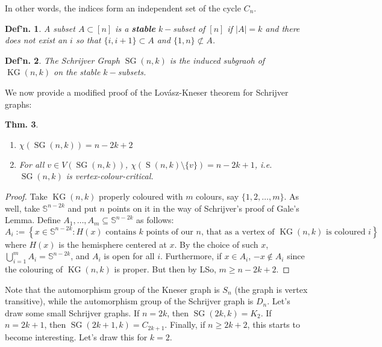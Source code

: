 \documentclass[12pt, a4paper]{book}
\DeclareMathOperator{\KG}{KG}
\DeclareMathOperator{\SG}{SG}
\newtheorem{theorem}{Thm.}[section]
\newtheorem{definition}[theorem]{Def'n.}
\theoremstyle{nonumberplain}
\newtheorem{proof}{Proof}
\begin{document}
In other words, the indices form an independent set of the cycle $C_n$.
\begin{definition}
    A subset $A\subset[n]$ is a \textbf{stable} $k-$subset of $[n]$ if $|A|=k$ and there does not exist an $i$ so that $\{i,i+1\}\subset A$ and $\{1,n\}\not\subset A$.
\end{definition}
\begin{definition}
    The Schrijver Graph $\operatorname{SG}(n,k)$ is the induced subgraoh of $\KG(n,k)$ on the stable $k-$subsets.
\end{definition}
We now provide a modified proof of the Lov\'asz-Kneser theorem for Schrijver graphs:
\begin{theorem}
    \begin{enumerate}[nolistsep]
        \item $\chi(\operatorname{SG}(n,k))=n-2k+2$
        \item For all $v\in V(\operatorname{SG}(n,k))$, $\chi(\operatorname{S}(n,k)\setminus\{v\})=n-2k+1$, i.e. $\operatorname{SG}(n,k)$ is vertex-colour-critical.
    \end{enumerate}
\end{theorem}
\begin{proof}
    Take $\KG(n,k)$ properly coloured with $m$ colours, say $\{1,2,\ldots,m\}$.
    As well, take $\mathbb{S}^{n-2k}$ and put $n$ points on it in the way of Schrijver's proof of Gale's Lemma.
    Define $A_1,\ldots,A_m\subseteq \mathbb{S}^{n-2k}$ as follows:
    \[A_i:=\left\{x\in\mathbb{S}^{n-2k}:H(x)\text{ contains $k$ points of our $n$, that as a vertex of $\KG(n,k)$ is coloured $i$}\right\}\]
    where $H(x)$ is the hemisphere centered at $x$.
    By the choice of such $x$, $\bigcup_{i=1}^m A_i=\mathbb{S}^{n-2k}$, and $A_i$ is open for all $i$.
    Furthermore, if $x\in A_i$, $-x\notin A_i$ since the colouring of $\KG(n,k)$ is proper.
    But then by LSo, $m\geq n-2k+2$.
\end{proof}
Note that the automorphism group of the Kneser graph is $S_n$ (the graph is vertex transitive), while the automorphism group of the Schrijver graph is $D_n$.
Let's draw some small Schrijver graphs.
If $n=2k$, then $\SG(2k,k)=K_2$.
If $n=2k+1$, then $\SG(2k+1,k)=C_{2k+1}$.
Finally, if $n\geq 2k+2$, this starts to become interesting.
Let's draw this for $k=2$.
\end{document}
